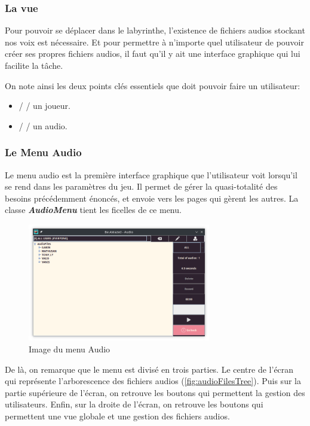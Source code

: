 \subsubsection{La vue}
\label{subsubsec:sonVue}

Pour pouvoir se déplacer dans le labyrinthe, l'existence de fichiers audios
stockant nos voix est nécessaire. Et pour permettre à n'importe quel
utilisateur de pouvoir créer ses propres fichiers audios, il faut qu'il y ait
une interface graphique qui lui facilite la tâche.

On note ainsi les deux points clés essentiels que doit pouvoir faire un
utilisateur:
\begin{itemize}
    \item{     /  /  un joueur.}
    \item{ /   /  un audio.}
\end{itemize}

\subsubsection*{Le Menu Audio}
\label{subsubsec:AudioMenu}

Le menu audio est la première interface graphique que l'utilisateur voit
lorsqu'il se rend dans les paramètres du jeu. Il permet de gérer la
quasi-totalité des besoins précédemment énoncés, et envoie vers les pages
qui gèrent les autres.
La classe \textbf{\textit{AudioMenu}} tient les ficelles de ce menu.

\begin{figure}[!htb]
    \centering
    \includegraphics[width=8cm]{ressources/Implementation/Son/AudioMenu.png}%
    \caption{Image du menu Audio}%
    \label{fig:AudioMenu}
\end{figure}

De là, on remarque que le menu est divisé en trois parties.
Le centre de l'écran qui représente l'arborescence des fichiers audios
(\ref{fig:audioFilesTree}).
Puis sur la partie supérieure de l'écran, on retrouve les boutons qui
permettent la gestion des utilisateurs.
Enfin, sur la droite de l'écran, on retrouve les boutons qui permettent une vue
globale et une gestion des fichiers audios.

